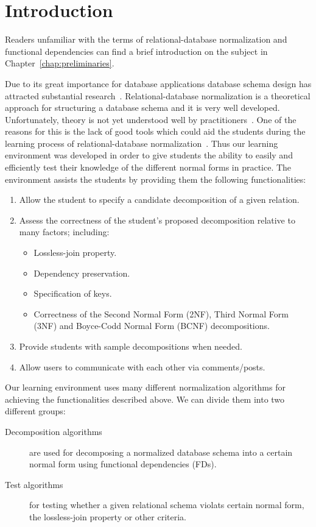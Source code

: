 \chapter{Introduction}
\label{chap:introduction}
Readers unfamiliar with the terms of relational-database normalization and 
functional dependencies can find a brief introduction on the subject in
Chapter~\ref{chap:preliminaries}. 

Due to its great importance for database applications database schema design has
attracted substantial research~\cite{p1}. Relational-database normalization is a 
theoretical approach for structuring a database schema and it is very well developed. 
Unfortunately, theory is not yet understood well by practitioners~\cite{p1}.
One of the reasons for this is the lack of good tools which could aid the students 
during the learning process of relational-database normalization~\cite{p8}. 
Thus our learning environment was developed in order to give students the ability to 
easily and efficiently test
their knowledge of the different normal forms in practice. The environment assists the students by 
providing them the following functionalities:

\begin{enumerate}
	\item Allow the student to specify a candidate decomposition of a given relation.
	\item Assess the correctness of the student's proposed decomposition relative to many factors; including:
		\begin{itemize}
			\item Lossless-join property.
			\item Dependency preservation.
			\item Specification of keys.
			\item Correctness of the Second Normal Form (2NF), Third Normal Form (3NF) and
			 Boyce-Codd Normal Form (BCNF) decompositions.
		\end{itemize}
	\item Provide students with sample decompositions when needed. 
	\item Allow users to communicate with each other via comments/posts.
\end{enumerate}

Our learning environment uses many different normalization 
algorithms for achieving the functionalities described above. 
We can divide them into two different groups:

\begin{description}
	\item[Decomposition algorithms] are used for decomposing a normalized database 
	schema into a certain normal form using functional dependencies (FDs).
	\item[Test algorithms] for testing whether a given relational schema
	violats certain normal form, the lossless-join property or other criteria.
\end{description}


